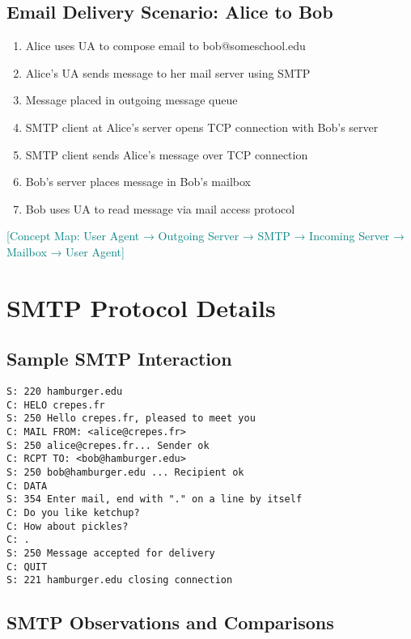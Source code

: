 \documentclass[12pt]{article}
\begin{document}
\subsection{Email Delivery Scenario: Alice to Bob}
\begin{enumerate}
    \item Alice uses UA to compose email to bob@someschool.edu
    \item Alice's UA sends message to her mail server using SMTP
    \item Message placed in outgoing message queue
    \item SMTP client at Alice's server opens TCP connection with Bob's server
    \item SMTP client sends Alice's message over TCP connection
    \item Bob's server places message in Bob's mailbox
    \item Bob uses UA to read message via mail access protocol
\end{enumerate}

\textcolor{teal}{[Concept Map: User Agent → Outgoing Server → SMTP → Incoming Server → Mailbox → User Agent]}

\section{SMTP Protocol Details}

\subsection{Sample SMTP Interaction}
\begin{verbatim}
S: 220 hamburger.edu
C: HELO crepes.fr
S: 250 Hello crepes.fr, pleased to meet you
C: MAIL FROM: <alice@crepes.fr>
S: 250 alice@crepes.fr... Sender ok
C: RCPT TO: <bob@hamburger.edu>
S: 250 bob@hamburger.edu ... Recipient ok
C: DATA
S: 354 Enter mail, end with "." on a line by itself
C: Do you like ketchup?
C: How about pickles?
C: .
S: 250 Message accepted for delivery
C: QUIT
S: 221 hamburger.edu closing connection
\end{verbatim}

\subsection{SMTP Observations and Comparisons}
\end{document}
